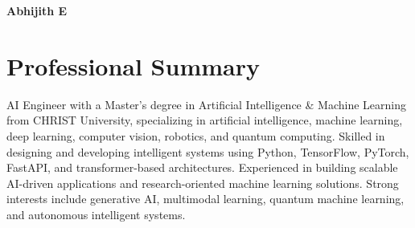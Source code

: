 \documentclass[a4paper,10.5pt]{article}
\begin{document}

\begin{center}

{\Huge\bfseries\color{textblack} Abhijith E}

\vspace{4pt}

\small
{}

\end{center}

\vspace{2pt}


\section{Professional Summary}

\small{
AI Engineer with a Master’s degree in Artificial Intelligence \& Machine Learning from CHRIST University, specializing in artificial intelligence, machine learning, deep learning, computer vision, robotics, and quantum computing. Skilled in designing and developing intelligent systems using Python, TensorFlow, PyTorch, FastAPI, and transformer-based architectures. Experienced in building scalable AI-driven applications and research-oriented machine learning solutions. Strong interests include generative AI, multimodal learning, quantum machine learning, and autonomous intelligent systems.
}

\end{document}
